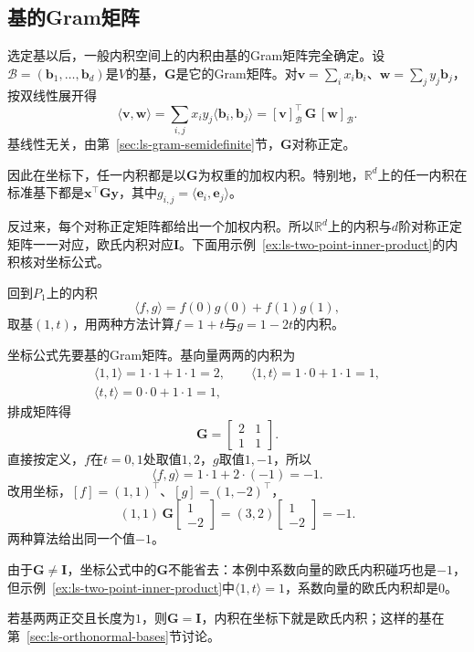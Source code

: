 \subsection{基的Gram矩阵}
\label{sec:ls-gram-coordinates}

选定基以后，一般内积空间上的内积由基的Gram矩阵完全确定。设$\mathcal B=(\bm b_1,\ldots,\bm b_d)$是$V$的基，$\bm G$是它的Gram矩阵。对$\bm v=\sum_ix_i\bm b_i$、$\bm w=\sum_jy_j\bm b_j$，按双线性展开得
\begin{equation}
 \langle\bm v,\bm w\rangle=\sum_{i,j}x_iy_j\langle\bm b_i,\bm b_j\rangle=[\bm v]_{\mathcal B}^\top\,\bm G\,[\bm w]_{\mathcal B}.
 \label{eq:ls-gram-coordinate-inner-product}
\end{equation}
基线性无关，由第~\ref{sec:ls-gram-semidefinite}节，$\bm G$对称正定。

因此在坐标下，任一内积都是以$\bm G$为权重的加权内积。特别地，$\mathbb R^d$上的任一内积在标准基下都是$\bm x^\top\bm G\bm y$，其中$g_{i,j}=\langle\bm e_i,\bm e_j\rangle$。

反过来，每个对称正定矩阵都给出一个加权内积。所以$\mathbb R^d$上的内积与$d$阶对称正定矩阵一一对应，欧氏内积对应$\bm I$。下面用示例~\ref{ex:ls-two-point-inner-product}的内积核对坐标公式。
\begin{example}[两点内积的坐标计算]
\label{ex:ls-two-point-inner-product-coordinates}
回到$P_1$上的内积
\[
 \langle f,g\rangle=f(0)g(0)+f(1)g(1) ,
\]
取基$(1,t)$，用两种方法计算$f=1+t$与$g=1-2t$的内积。

坐标公式先要基的Gram矩阵。基向量两两的内积为
\[
 \begin{gathered}
 \langle1,1\rangle=1\cdot1+1\cdot1=2,\qquad
 \langle1,t\rangle=1\cdot0+1\cdot1=1,\\
 \langle t,t\rangle=0\cdot0+1\cdot1=1,
 \end{gathered}
\]
排成矩阵得
\[
 \bm G=\begin{bmatrix}2&1\\1&1\end{bmatrix}.
\]
直接按定义，$f$在$t=0,1$处取值$1,2$，$g$取值$1,-1$，所以
\[
 \langle f,g\rangle=1\cdot1+2\cdot(-1)=-1 .
\]
改用坐标，$[f]=(1,1)^\top$、$[g]=(1,-2)^\top$，
\[
 (1,1)\,\bm G\begin{bmatrix}1\\-2\end{bmatrix}=(3,2)\begin{bmatrix}1\\-2\end{bmatrix}=-1 .
\]
两种算法给出同一个值$-1$。

由于$\bm G\neq\bm I$，坐标公式中的$\bm G$不能省去：本例中系数向量的欧氏内积碰巧也是$-1$，但示例~\ref{ex:ls-two-point-inner-product}中$\langle1,t\rangle=1$，系数向量的欧氏内积却是$0$。
\end{example}
若基两两正交且长度为$1$，则$\bm G=\bm I$，内积在坐标下就是欧氏内积；这样的基在第~\ref{sec:ls-orthonormal-bases}节讨论。

